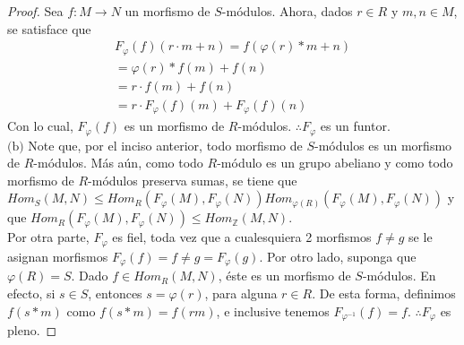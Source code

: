 \documentclass{article}
\newcommand{\lrprth}[1]{
    \left(#1\right)
}
\newcommand{\ringmodhom}[3]{
	Hom_{#1}\lrprth{#2,#3}
}
\theoremstyle{definition}
\theoremstyle{plain}
\theoremstyle{plain}
\theoremstyle{definition}
\theoremstyle{definition}
\theoremstyle{definition}
\theoremstyle{definition}
\theoremstyle{definition}
\theoremstyle{definition}
\begin{document}
\begin{enumerate}[label=\textbf{Ej \arabic*.}]
\begin{proof}
		Sea $f:M \longrightarrow N$ un morfismo de $S$-módulos. Ahora, dados $r \in R$ y $m,n \in M$, se satisface que
		\begin{align*}
			F_{\varphi}\lrprth{f}\lrprth{r \cdot m + n}=f\lrprth{\varphi\lrprth{r}*m+n}\\
			=\varphi \lrprth{r}*f\lrprth{m}+f\lrprth{n}\\
			=r \cdot f\lrprth{m}+f\lrprth{n}\\
			=r \cdot F_{\varphi} \lrprth{f}\lrprth{m}+F_{\varphi} \lrprth{f}\lrprth{n}
		\end{align*}
		Con lo cual, $F_{\varphi} \lrprth{f}$ es un morfismo de $R$-módulos. $\therefore F_{\varphi}$ es un funtor.\\
	
		$\boxed{\text{(b)}}$ Note que, por el inciso anterior, todo morfismo de $S$-módulos es un morfismo de $R$-módulos. Más aún, como todo $R$-módulo es un grupo abeliano y como todo morfismo de $R$-módulos preserva sumas, se tiene que $\ringmodhom{S}{M}{N}\leq\ringmodhom{R}{F_{\varphi}\lrprth{M}}{F_{\varphi}\lrprth{N}}\ringmodhom{\varphi \lrprth{R}}{F_{\varphi}\lrprth{M}}{F_{\varphi}\lrprth{N}}$ y que $\ringmodhom{R}{F_{\varphi}\lrprth{M}}{F_{\varphi}\lrprth{N}} \leq \ringmodhom{\mathbb{Z}}{M}{N}$.\\
	
		Por otra parte, $F_{\varphi}$ es fiel, toda vez que a cualesquiera 2 morfismos $f \neq g$ se le asignan morfismos $F_{\varphi} \lrprth{f} = f \neq g = F_{\varphi} \lrprth{g}$. Por otro lado, suponga que $\varphi \lrprth{R}=S$. Dado $f \in \ringmodhom{R}{M}{N}$, éste es un morfismo de $S$-módulos. En efecto, si $s \in S$, entonces $s = \varphi \lrprth{r}$, para alguna $r \in R$. De esta forma, definimos $f\lrprth{s*m}$ como $f\lrprth{s*m}=f\lrprth{rm}$, e inclusive tenemos $F_{\varphi^{-1}} \lrprth{f}=f$. $\therefore F_{\varphi}$ es pleno.
	\end{proof}


\end{enumerate}
\end{document}
